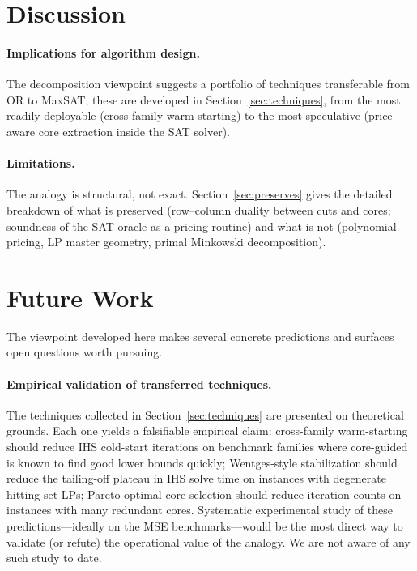 \documentclass[11pt,a4paper]{article}
\begin{document}
\section{Discussion}
\label{sec:discussion}

\paragraph{Implications for algorithm design.}
The decomposition viewpoint suggests a portfolio of techniques transferable
from OR to MaxSAT; these are developed in Section~\ref{sec:techniques}, from
the most readily deployable (cross-family warm-starting) to the most
speculative (price-aware core extraction inside the SAT solver).

\paragraph{Limitations.}
The analogy is structural, not exact. Section~\ref{sec:preserves} gives the
detailed breakdown of what is preserved (row--column duality between cuts and
cores; soundness of the SAT oracle as a pricing routine) and what is not
(polynomial pricing, LP master geometry, primal Minkowski decomposition).

\section{Future Work}
\label{sec:future}

The viewpoint developed here makes several concrete predictions and surfaces
open questions worth pursuing.

\paragraph{Empirical validation of transferred techniques.} The techniques
collected in Section~\ref{sec:techniques} are presented on theoretical
grounds. Each one yields a falsifiable empirical claim: cross-family
warm-starting should reduce IHS cold-start iterations on benchmark families
where core-guided is known to find good lower bounds quickly; Wentges-style
stabilization should reduce the tailing-off plateau in IHS solve time on
instances with degenerate hitting-set LPs; Pareto-optimal core selection
should reduce iteration counts on instances with many redundant cores.
Systematic experimental study of these predictions---ideally on the MSE
benchmarks---would be the most direct way to validate (or refute) the
operational value of the analogy. We are not aware of any such study to date.
\end{document}
